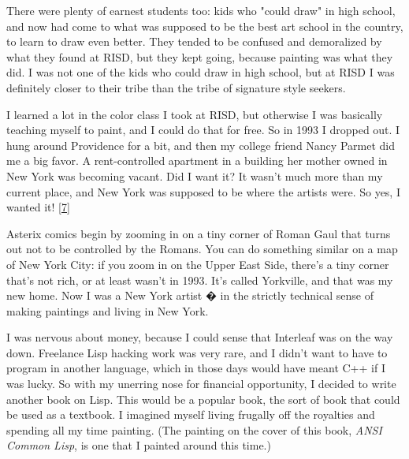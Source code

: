 There were plenty of earnest students too: kids
                  who "could draw" in high school, and now had come to what was
                  supposed to be the best art school in the country, to learn to
                  draw even better. They tended to be confused and demoralized
                  by what they found at RISD, but they kept going, because
                  painting was what they did. I was not one of the kids who
                  could draw in high school, but at RISD I was definitely closer
                  to their tribe than the tribe of signature style seekers.

I
                  learned a lot in the color class I took at RISD, but otherwise
                  I was basically teaching myself to paint, and I could do that
                  for free. So in 1993 I dropped out. I hung around Providence
                  for a bit, and then my college friend Nancy Parmet did me a
                  big favor. A rent-controlled apartment in a building her
                  mother owned in New York was becoming vacant. Did I want it?
                  It wasn't much more than my current place, and New York was
                  supposed to be where the artists were. So yes, I wanted it!
                  [\href{\#f7n}{7}]

Asterix comics begin by zooming in on a tiny
                  corner of Roman Gaul that turns out not to be controlled by
                  the Romans. You can do something similar on a map of New York
                  City: if you zoom in on the Upper East Side, there's a tiny
                  corner that's not rich, or at least wasn't in 1993. It's
                  called Yorkville, and that was my new home. Now I was a New
                  York artist � in the strictly technical sense of making
                  paintings and living in New York.

I was nervous
                  about money, because I could sense that Interleaf was on the
                  way down. Freelance Lisp hacking work was very rare, and I
                  didn't want to have to program in another language, which in
                  those days would have meant C++ if I was lucky. So with my
                  unerring nose for financial opportunity, I decided to write
                  another book on Lisp. This would be a popular book, the sort
                  of book that could be used as a textbook. I imagined myself
                  living frugally off the royalties and spending all my time
                  painting. (The painting on the cover of this book,
                  \emph{ANSI Common Lisp}, is one that I painted around this
                  time.)

